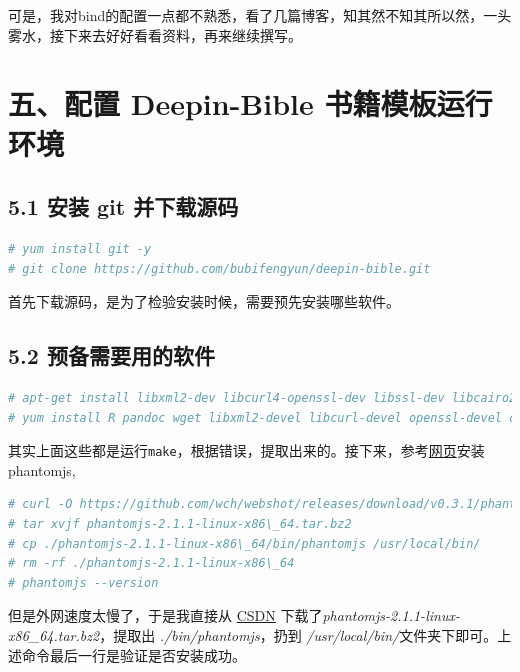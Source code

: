 \documentclass[doctor,openright,twoside]{sjtuthesis}
\newcommand{\passthrough}[1]{#1}
\theoremstyle{plain}
\theoremstyle{definition}
\theoremstyle{remark}
\theoremstyle{ocrenumbox}
\theoremstyle{plain}
\begin{document}
可是，我对bind的配置一点都不熟悉，看了几篇博客，知其然不知其所以然，一头雾水，接下来去好好看看资料，再来继续撰写。

\hypertarget{deepin-bible-}{%
\section{五、配置 Deepin-Bible 书籍模板运行环境}\label{deepin-bible-}}

\hypertarget{git-}{%
\subsection{5.1 安装 git 并下载源码}\label{git-}}

\begin{lstlisting}[language=bash]
# yum install git -y
# git clone https://github.com/bubifengyun/deepin-bible.git
\end{lstlisting}

首先下载源码，是为了检验安装时候，需要预先安装哪些软件。

\hypertarget{section-138}{%
\subsection{5.2 预备需要用的软件}\label{section-138}}

\begin{lstlisting}[language=bash]
# apt-get install libxml2-dev libcurl4-openssl-dev libssl-dev libcairo2-dev libcurl4-openssl-dev libssl-dev libgit2-dev libssl-dev libssh2-1-dev curl openssl
# yum install R pandoc wget libxml2-devel libcurl-devel openssl-devel cairo-devel libcurl-devel openssl-devel libgit2-devel openssl-devel libssh2-devel curl openssl ImageMagick -y
\end{lstlisting}

其实上面这些都是运行\passthrough{\lstinline!make!}，根据错误，提取出来的。接下来，参考\href{https://www.vultr.com/docs/how-to-install-phantomjs-on-ubuntu-16-04}{网页}安装 phantomjs,

\begin{lstlisting}[language=bash]
# curl -O https://github.com/wch/webshot/releases/download/v0.3.1/phantomjs-2.1.1-linux-x86\_64.tar.bz2
# tar xvjf phantomjs-2.1.1-linux-x86\_64.tar.bz2
# cp ./phantomjs-2.1.1-linux-x86\_64/bin/phantomjs /usr/local/bin/
# rm -rf ./phantomjs-2.1.1-linux-x86\_64
# phantomjs --version
\end{lstlisting}

但是外网速度太慢了，于是我直接从 \href{https://download.csdn.net/download/bubifengyun/11258408}{CSDN} 下载了\emph{phantomjs-2.1.1-linux-x86\_64.tar.bz2}，提取出 \emph{./bin/phantomjs}，扔到 \emph{/usr/local/bin/}文件夹下即可。上述命令最后一行是验证是否安装成功。
\end{document}
